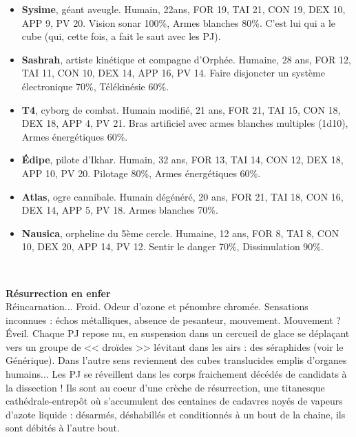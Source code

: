 \documentclass[11pt,twoside,a4paper]{book}
\begin{document}
\setlength\parindent{20pt}
\begin{itemize}
	\item \textbf{Sysime}, g{\'e}ant aveugle. Humain, 22ans, FOR 19, TAI 21, CON 19, DEX 10, APP 9, PV 20. Vision sonar 100\%, Armes blanches 80\%. C'est lui qui a le cube (qui, cette fois, a fait le saut avec les PJ).
	\item \textbf{Sashrah}, artiste kin{\'e}tique et compagne d'Orph{\'e}e. Humaine, 28 ans, FOR 12, TAI 11, CON 10, DEX 14, APP 16, PV 14. Faire disjoncter un syst{\`e}me {\'e}lectronique 70\%, T{\'e}l{\'e}kin{\'e}sie 60\%.
	\item \textbf{T4}, cyborg de combat. Humain modifi{\'e}, 21 ans, FOR 21, TAI 15, CON 18, DEX 18, APP 4, PV 21. Bras artificiel avec armes blanches multiples (1d10), Armes {\'e}nerg{\'e}tiques 60\%.
	\item \textbf{{\'E}dipe}, pilote d'Ikhar. Humain, 32 ans, FOR 13, TAI 14, CON 12, DEX 18, APP 10, PV 20. Pilotage 80\%, Armes {\'e}nerg{\'e}tiques 60\%.
	\item \textbf{Atlas}, ogre cannibale. Humain d{\'e}g{\'e}n{\'e}r{\'e}, 20 ans, FOR 21, TAI 18, CON 16, DEX 14, APP 5, PV 18. Armes blanches 70\%.
	\item \textbf{Nausica}, orpheline du 5{\`e}me cercle. Humaine, 12 ans, FOR 8, TAI 8, CON 10, DEX 20, APP 14, PV 12. Sentir le danger 70\%, Dissimulation 90\%.
\end{itemize}~\\
\setlength\parindent{0pt}

\textbf{\large R{\'e}surrection en enfer}~\\

R{\'e}incarnation... Froid. Odeur d'ozone et p{\'e}nombre chrom{\'e}e. Sensations inconnues : {\'e}chos m{\'e}talliques, absence de pesanteur, mouvement. Mouvement ? {\'E}veil. Chaque PJ repose nu, en suspension dans un cercueil de glace se d{\'e}pla\c{c}ant vers un groupe de << dro{\"i}des >> l{\'e}vitant dans les airs : des s{\'e}raphides (voir le G{\'e}n{\'e}rique). Dans l'autre sens reviennent des cubes translucides emplis d'organes humains... Les PJ se r{\'e}veillent dans les corps fraichement d{\'e}c{\'e}d{\'e}s de candidats {\`a} la dissection ! Ils sont au coeur d'une cr{\`e}che de r{\'e}surrection, une titanesque cath{\'e}drale-entrep{\^o}t o{\`u} s'accumulent des centaines de cadavres noy{\'e}s de vapeurs d'azote liquide : d{\'e}sarm{\'e}s, d{\'e}shabill{\'e}s et conditionn{\'e}s {\`a} un bout de la chaine, ils sont d{\'e}bit{\'e}s {\`a} l'autre bout.~\\
\end{document}
